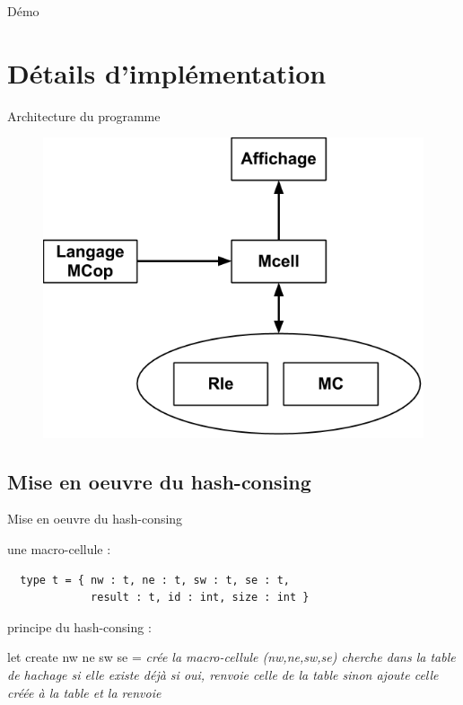 \documentclass{beamer}
\begin{document}
\begin{frame}{Démo}
  
\end{frame}

\section{Détails d'implémentation}

\begin{frame}{Architecture du programme}

\begin{figure}
  \includegraphics[scale=0.4]{dtech.png}
\end{figure}

\end{frame}

\subsection{Mise en oeuvre du hash-consing}

\begin{frame}[fragile]{Mise en oeuvre du hash-consing}

une macro-cellule :

\begin{verbatim}
  type t = { nw : t, ne : t, sw : t, se : t, 
             result : t, id : int, size : int }
\end{verbatim}

\medskip

principe du hash-consing :

\begin{semiverbatim}
  let create nw ne sw se =
    \textit{crée la macro-cellule (nw,ne,sw,se)
    cherche dans la table de hachage si elle existe déjà
    si oui, renvoie celle de la table
    sinon ajoute celle créée à la table et la renvoie}
\end{semiverbatim}

\end{frame}
\end{document}
